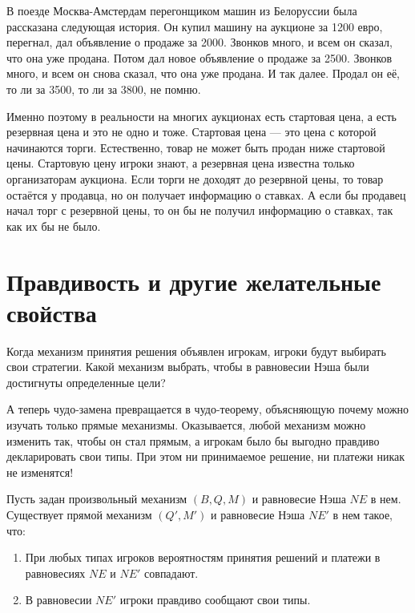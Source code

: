 В поезде Москва-Амстердам перегонщиком машин из Белоруссии была рассказана следующая история. Он купил машину на аукционе за 1200 евро, перегнал, дал объявление о продаже за 2000. Звонков много, и всем он сказал, что она уже продана. Потом дал новое  объявление о продаже за 2500. Звонков много, и всем он снова сказал, что она уже продана. И так далее. Продал он её, то ли за 3500, то ли за 3800, не помню.

Именно поэтому в реальности на многих аукционах есть стартовая цена, а есть резервная цена и это не одно и тоже. Стартовая цена — это цена с которой начинаются торги. Естественно, товар не может быть продан ниже стартовой цены. Стартовую цену игроки знают, а резервная цена известна только организаторам аукциона. Если торги не доходят до резервной цены, то товар остаётся у продавца, но он получает информацию о ставках. А если бы продавец начал торг с резервной цены, то он бы не получил информацию о ставках, так как их бы не было.


\section{Правдивость и другие желательные свойства}

Когда механизм принятия решения объявлен игрокам, игроки будут выбирать свои стратегии. Какой механизм выбрать, чтобы в равновесии Нэша были достигнуты определенные цели?

А теперь чудо-замена превращается в чудо-теорему, объясняющую почему можно изучать только прямые механизмы. Оказывается, любой механизм можно изменить так, чтобы он стал прямым, а игрокам было бы выгодно правдиво декларировать свои типы. При этом ни принимаемое решение, ни платежи никак не изменятся!

\begin{myth} \label{revelation_principle}
Пусть задан произвольный механизм $ (B, Q, M) $ и равновесие Нэша $NE$ в нем. Существует прямой механизм $ (Q', M') $ и равновесие Нэша $NE'$ в нем такое, что:
\begin{enumerate}
\item При любых типах игроков вероятностям принятия решений и платежи в равновесиях $ NE $ и $ NE' $ совпадают.
\item В равновесии $ NE' $ игроки правдиво сообщают свои типы.
\end{enumerate}
\end{myth}


